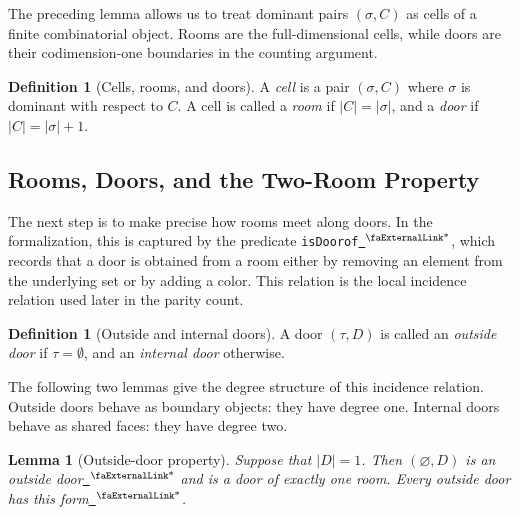 \documentclass{article}
\newtheorem{lemma}[theorem]{Lemma}
\theoremstyle{definition}
\newtheorem{definition}[theorem]{Definition}
\newcommand{\extlink}{~\ensuremath{{}^\text{\faExternalLink*}}}
\begin{document}
The preceding lemma allows us to treat dominant pairs $(\sigma,C)$ as cells of a finite combinatorial object. Rooms are the full-dimensional cells, while doors are their codimension-one boundaries in the counting argument.

\begin{definition}[Cells, rooms, and doors]\label{def:Cells, rooms, and doors}
A \emph{cell} is a pair $(\sigma, C)$ where $\sigma$ is dominant with respect to $C$. A cell is called a \emph{room} if $|C| = |\sigma|$, and a \emph{door} if $|C| = |\sigma| + 1$.
\end{definition}

\subsection{Rooms, Doors, and the Two-Room Property}\label{subsec:scarf-doors}

The next step is to make precise how rooms meet along doors. In the formalization, this is captured by the predicate \verb|isDoorof|\href{https://github.com/Solo-ary/Game-Theory-Formalization/blob/7b49d5267d4f26b17bdf071250880b63e96999b6/Brouwer/Gametheory/Scarf.lean#L193-L195}{\extlink}, which records that a door is obtained from a room either by removing an element from the underlying set or by adding a color. This relation is the local incidence relation used later in the parity count.

\begin{definition}[Outside and internal doors]\label{def:Outside and internal doors}
A door $(\tau,D)$ is called an \emph{outside door} if $\tau = \emptyset$, and an \emph{internal door} otherwise.
\end{definition}


The following two lemmas give the degree structure of this incidence relation. Outside doors behave as boundary objects: they have degree one. Internal doors behave as shared faces: they have degree two.

\begin{lemma}[Outside-door property]\label{lemma:outsidedoor-property}
Suppose that $|D| = 1$. Then $(\varnothing, D)$ is an outside door\href{https://github.com/Solo-ary/Game-Theory-Formalization/blob/7b49d5267d4f26b17bdf071250880b63e96999b6/Brouwer/Gametheory/Scarf.lean#L258-L271}{\extlink} and is a door of exactly one room. Every outside door has this form\href{https://github.com/Solo-ary/Game-Theory-Formalization/blob/7b49d5267d4f26b17bdf071250880b63e96999b6/Brouwer/Gametheory/Scarf.lean#L274-L283}{\extlink}.
\end{lemma}
\end{document}
